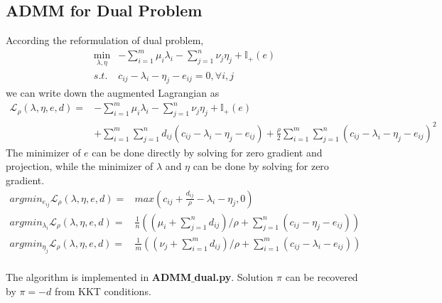 \documentclass{article}
\begin{document}
\begin{large}
\subsection{ADMM for Dual Problem}
According the reformulation of dual problem,
\begin{equation}
  \begin{aligned}
    \min_{\lambda,\eta} & -\sum_{i=1}^{m}\mu_{i}\lambda_{i}-\sum_{j=1}^{n}\nu_{j}\eta_{j}+\mathbb{I}_{+}(e)\\
    s.t. & c_{i j}-\lambda_{i}-\eta_{j}-e_{ij}=0, \forall i, j
    \end{aligned}
\end{equation} 
we can write down the augmented Lagrangian as
\begin{equation} \label{Eq:admm_dual}
  \begin{aligned}
\mathcal{L}_{\rho}(\lambda,\eta,e,d)=&-\sum_{i=1}^{m}\mu_{i}\lambda_{i}-\sum_{j=1}^{n}\nu_{j}\eta_{j}+\mathbb{I}_{+}(e)\\
&+\sum_{i=1}^{m}\sum_{j=1}^{n}d_{ij}(c_{i j}-\lambda_{i}-\eta_{j}-e_{ij})+\frac{\rho}{2}\sum_{i=1}^{m}\sum_{j=1}^{n}(c_{i j}-\lambda_{i}-\eta_{j}-e_{ij})^{2}
\end{aligned}
\end{equation}
The minimizer of $e$ can be done directly by solving for zero gradient and projection, while
the minimizer of $\lambda$ and $\eta$ can be done by solving for zero gradient.
\begin{equation}
  \begin{aligned}
    argmin_{e_{ij}}\mathcal{L}_{\rho}(\lambda,\eta,e,d)=& max\left(c_{ij}+\frac{d_{ij}}{\rho}-\lambda_{i}-\eta_{j}, 0\right)\\
    argmin_{\lambda_{i}}\mathcal{L}_{\rho}(\lambda,\eta,e,d)=& \frac{1}{n}\left((\mu_{i}+\sum_{j=1}^{n}d_{ij})/\rho+\sum_{j=1}^{n}(c_{ij}-\eta_{j}-e_{ij})\right)\\
    argmin_{\eta_{j}}\mathcal{L}_{\rho}(\lambda,\eta,e,d)=& \frac{1}{m}\left((\nu_{j}+\sum_{i=1}^{m}d_{ij})/\rho+\sum_{i=1}^{m}(c_{ij}-\lambda_{i}-e_{ij})\right)\\
  \end{aligned}
\end{equation}

The algorithm is implemented in \textbf{ADMM$\_$dual.py}.
Solution $\pi$ can be recovered by $\pi=-d$ from KKT conditions.


\end{large}
\end{document}
